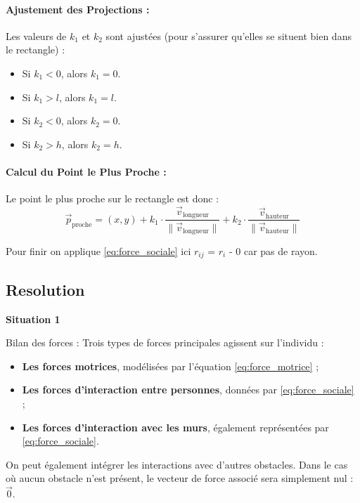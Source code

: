 \documentclass[a4paper,12pt]{article}
\begin{document}
\paragraph{Ajustement des Projections :}

Les valeurs de $k_1$ et $k_2$ sont ajustées (pour s'assurer qu'elles se situent bien dans le rectangle) :
\begin{itemize}
    \item Si $k_1 < 0$, alors $k_1 = 0$.
    \item Si $k_1 > l$, alors $k_1 = l$.
    \item Si $k_2 < 0$, alors $k_2 = 0$.
    \item Si $k_2 > h$, alors $k_2 = h$.
\end{itemize}

\paragraph{Calcul du Point le Plus Proche :}

Le point le plus proche sur le rectangle est donc :
\[
\vec{p}_{\text{proche}} = (x, y) + k_1 \cdot \frac{\vec{v}_{\text{longueur}}}{\|\vec{v}_{\text{longueur}}\|} + k_2 \cdot \frac{\vec{v}_{\text{hauteur}}}{\|\vec{v}_{\text{hauteur}}\|}
\]

Pour finir on applique \eqref{eq:force_sociale} ici $r_{ij}$ = $r_i$ - 0 car pas de rayon.

\subsection{Resolution}

\textbf{Situation 1}

Bilan des forces :
Trois types de forces principales agissent sur l’individu :
\begin{itemize}
\item \textbf{Les forces motrices}, modélisées par l’équation \eqref{eq:force_motrice} ;
\item \textbf{Les forces d’interaction entre personnes}, données par \eqref{eq:force_sociale} ;
\item \textbf{Les forces d’interaction avec les murs}, également représentées par \eqref{eq:force_sociale}.
\end{itemize}

On peut également intégrer les interactions avec d’autres obstacles. Dans le cas où aucun obstacle n’est présent, le vecteur de force associé sera simplement nul : $\vec{0}$.
\end{document}
